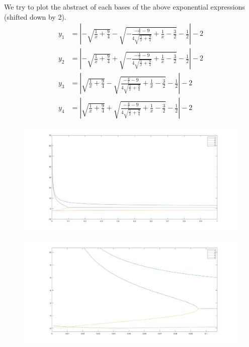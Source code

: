 \documentclass[]{book}
\theoremstyle{definition}
\begin{document}
We try to plot the abstract of each bases of the above exponential expressions (shifted down by 2).
\begin{equation}
\begin{split}
    y_1 &=\left| -\sqrt{\frac{1}{x}+\frac{9}{4}} - \sqrt{-\frac{-\frac{4}{x}-9}{4\sqrt{\frac{1}{x}+\frac{9}{4}}}+\frac{1}{x}-\frac{3}{2}} - \frac{1}{2} \right|-2 \\
    y_2 &=\left| -\sqrt{\frac{1}{x}+\frac{9}{4}} + \sqrt{-\frac{-\frac{4}{x}-9}{4\sqrt{\frac{1}{x}+\frac{9}{4}}}+\frac{1}{x}-\frac{3}{2}} - \frac{1}{2} \right|-2 \\
    y_3 &=\left| \sqrt{\frac{1}{x}+\frac{9}{4}} - \sqrt{\frac{-\frac{4}{x}-9}{4\sqrt{\frac{1}{x}+\frac{9}{4}}}+\frac{1}{x}-\frac{3}{2}} - \frac{1}{2} \right|-2 \\
    y_4 &=\left| \sqrt{\frac{1}{x}+\frac{9}{4}} + \sqrt{\frac{-\frac{4}{x}-9}{4\sqrt{\frac{1}{x}+\frac{9}{4}}}+\frac{1}{x}-\frac{3}{2}} - \frac{1}{2} \right|-2
\end{split}
\end{equation}
\begin{figure}[H]
    \centering
    \includegraphics[width=1\textwidth]{figures/matfig1.jpg}
    \caption{}
\end{figure}
\begin{figure}[H]
    \centering\includegraphics[width=1\textwidth]{figures/matfig2.jpg}
    \caption{}
\end{figure}
\end{document}

